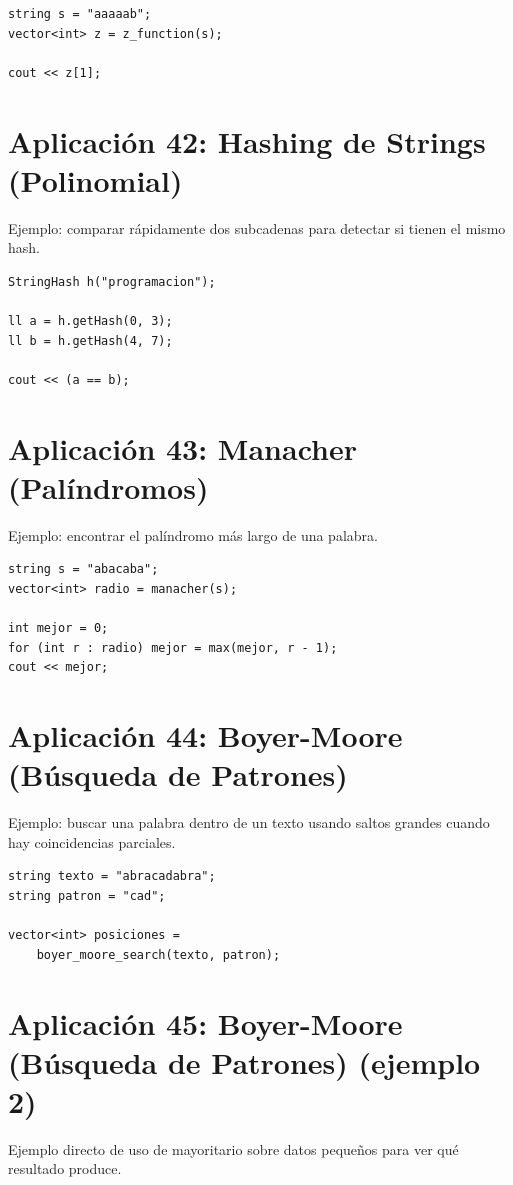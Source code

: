 \documentclass[10pt,twocolumn,letterpaper]{report}
\begin{document}
\begin{lstlisting}
string s = "aaaaab";
vector<int> z = z_function(s);

cout << z[1];
\end{lstlisting}

\section{Aplicación 42: Hashing de Strings (Polinomial)}
Ejemplo: comparar rápidamente dos subcadenas para detectar si tienen el mismo hash.

\begin{lstlisting}
StringHash h("programacion");

ll a = h.getHash(0, 3);
ll b = h.getHash(4, 7);

cout << (a == b);
\end{lstlisting}

\section{Aplicación 43: Manacher (Palíndromos)}
Ejemplo: encontrar el palíndromo más largo de una palabra.

\begin{lstlisting}
string s = "abacaba";
vector<int> radio = manacher(s);

int mejor = 0;
for (int r : radio) mejor = max(mejor, r - 1);
cout << mejor;
\end{lstlisting}

\section{Aplicación 44: Boyer-Moore (Búsqueda de Patrones)}
Ejemplo: buscar una palabra dentro de un texto usando saltos grandes cuando hay coincidencias parciales.

\begin{lstlisting}
string texto = "abracadabra";
string patron = "cad";

vector<int> posiciones =
    boyer_moore_search(texto, patron);
\end{lstlisting}

\section{Aplicación 45: Boyer-Moore (Búsqueda de Patrones) (ejemplo 2)}
Ejemplo directo de uso de mayoritario sobre datos pequeños para ver qué resultado produce.
\end{document}
